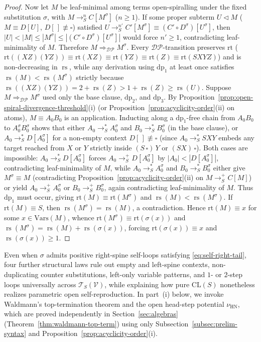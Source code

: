 \documentclass[11pt,reqno]{amsart}
\numberwithin{equation}{section}
\theoremstyle{plain}
\theoremstyle{definition}
\theoremstyle{remark}
\DeclareMathOperator{\rs}{rs}
\newcommand{\CLS}{\mathrm{CL}(S)}
\newcommand{\TSV}{\mathcal{T}_S(\mathcal{V})}
\newcommand{\HN}{\mathrm{HN}}
\newcommand{\redS}{\to_S}
\newcommand{\redSp}{\to_S^+}
\newcommand{\redSs}{\to_S^*}
\begin{document}
\begin{proof}
Now let $M$ be leaf-minimal among terms open-spiralling under the fixed substitution $\sigma$, with $M \redS^n C[M^\sigma]$ ($n \ge 1$). If some proper subterm $U \triangleleft M$ ($M \equiv D[U]$, $D[\,] \not\equiv \square$) satisfied $U \redS^{n'} C'[M^\sigma] \equiv (C' \circ D^\sigma)[U^\sigma]$, then $|U| < |M| \le |M^\sigma| \le |(C' \circ D^\sigma)[U^\sigma]|$ would force $n' \ge 1$, contradicting leaf-minimality of $M$. Therefore $M \Rightarrow_{\mathcal{DP}} M^\sigma$. Every $\mathcal{DP}$-transition preserves $\mathrm{rt}$ ($\mathrm{rt}((X Z)(Y Z)) \equiv \mathrm{rt}(X Z) \equiv \mathrm{rt}(Y Z) \equiv \mathrm{rt}(Z) \equiv \mathrm{rt}(S X Y Z)$) and is non-decreasing in $\rs$, while any derivation using $\mathrm{dp}_1$ at least once satisfies $\rs(M) < \rs(M^\sigma)$ strictly because $\rs((X Z)(Y Z)) = 2 + \rs(Z) > 1 + \rs(Z) \ge \rs(U)$. Suppose $M \Rightarrow_{\mathcal{DP}} M^\sigma$ used only the base clause, $\mathrm{dp}_2$, and $\mathrm{dp}_3$. By Proposition~\ref{prop:open-spiral-divergence-threshold}(i) (or Proposition~\ref{prop:acyclicity-order}(ii) on atoms), $M \equiv A_0 B_0$ is an application. Inducting along a $\mathrm{dp}_1$-free chain from $A_0 B_0$ to $A_0^\sigma B_0^\sigma$ shows that either $A_0 \redSs A_0^\sigma$ and $B_0 \redSs B_0^\sigma$ (in the base clause), or $A_0 \redSs D[A_0^\sigma]$ for a non-empty context $D[\,] \not\equiv \square$ (since $A_0 \redSs S X Y$ embeds any target reached from $X$ or $Y$ strictly inside $(S\,\square)\,Y$ or $(S X)\,\square$). Both cases are impossible: $A_0 \redSs D[A_0^\sigma]$ forces $A_0 \redSp D[A_0^\sigma]$ by $|A_0| < |D[A_0^\sigma]|$, contradicting leaf-minimality of $M$, while $A_0 \redSs A_0^\sigma$ and $B_0 \redSs B_0^\sigma$ either give $M^\sigma \equiv M$ (contradicting Proposition~\ref{prop:acyclicity-order}(ii) on $M \redSp C[M]$) or yield $A_0 \redSp A_0^\sigma$ or $B_0 \redSp B_0^\sigma$, again contradicting leaf-minimality of $M$. Thus $\mathrm{dp}_1$ must occur, giving $\mathrm{rt}(M) \equiv \mathrm{rt}(M^\sigma)$ and $\rs(M) < \rs(M^\sigma)$. If $\mathrm{rt}(M) \equiv S$, then $\rs(M^\sigma) = \rs(M)$, a contradiction. Hence $\mathrm{rt}(M) \equiv x$ for some $x \in \mathrm{Vars}(M)$, whence $\mathrm{rt}(M^\sigma) \equiv \mathrm{rt}(\sigma(x))$ and $\rs(M^\sigma) = \rs(M) + \rs(\sigma(x))$, forcing $\mathrm{rt}(\sigma(x)) \equiv x$ and $\rs(\sigma(x)) \ge 1$.
\end{proof}

Even when $\sigma$ admits positive right-spine self-loops satisfying \eqref{eq:self-right-tail}, four further structural laws rule out empty and left-spine contexts, non-duplicating counter substitutions, left-only variable patterns, and $1$- or $2$-step loops universally across $\TSV$, while explaining how pure $\CLS$ nonetheless realizes parametric open self-reproduction. In part~(i) below, we invoke Waldmann's top-termination theorem and the open head-step potential $\nu_{\HN}$, which are proved independently in Section~\ref{sec:algebras} (Theorem~\ref{thm:waldmann-top-term}) using only Subsection~\ref{subsec:prelim-syntax} and Proposition~\ref{prop:acyclicity-order}(i).
\end{document}
